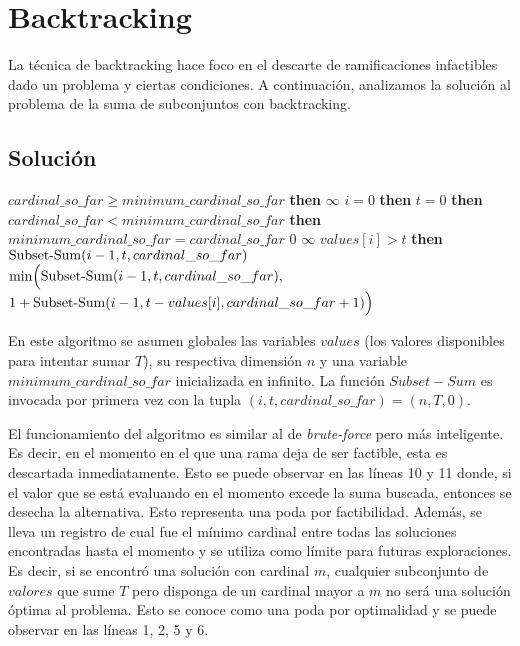 \section{Backtracking}
La técnica de backtracking hace foco en el descarte de ramificaciones infactibles dado un problema y ciertas condiciones. A continuación, analizamos la solución al problema de la suma de subconjuntos con backtracking.

\subsection{Solución}
\begin{center}
	\begin{minipage}{.8\textwidth}
		\begin{codebox}
				\li \If $cardinal\_so\_far \geq minimum\_cardinal\_so\_far$ \textbf{then} \Then
					\li \Return $\infty$
				\End
				\zi
				\li \If $i = 0$ \textbf{then} \Then
					\li \If $t = 0$ \textbf{then}
					\li \Then
						\If $cardinal\_so\_far < minimum\_cardinal\_so\_far$ \textbf{then} \Then
							\li $minimum\_cardinal\_so\_far = cardinal\_so\_far$
						\End
						\zi
						\li \Return $0$
					\li \Else
						\li \Return $\infty$
					\End
				\li \Else \If $values[i] > t$ \textbf{then}
					\li \Return $\func{Subset-Sum}(i - 1, t, cardinal\_so\_far)$
				\li \Else
					\li \Return $\func{min}\Big(\func{Subset-Sum}(i - 1, t, cardinal\_so\_far),$
					\Indentmore \Indentmore \zi $1 + \func{Subset-Sum}(i - 1, t - values[i], cardinal\_so\_far + 1)\Big)$
				\End
			\End
		\end{codebox}

		\label{fig:alg-backtracking}
	\end{minipage}
\end{center}

En este algoritmo se asumen globales las variables $values$ (los valores disponibles para intentar sumar $T$), su respectiva dimensión $n$ y una variable $minimum\_cardinal\_so\_far$ inicializada en infinito. La función $Subset-Sum$ es invocada por primera vez con la tupla $(i, t, cardinal\_so\_far) = (n, T, 0)$.

\vskip 8pt

El funcionamiento del algoritmo es similar al de \textit{brute-force} pero más inteligente. Es decir, en el momento en el que una rama deja de ser factible, esta es descartada inmediatamente. Esto se puede observar en las líneas 10 y 11 donde, si el valor que se está evaluando en el momento excede la suma buscada, entonces se desecha la alternativa. Esto representa una poda por factibilidad. Además, se lleva un registro de cual fue el mínimo cardinal entre todas las soluciones encontradas hasta el momento y se utiliza como límite para futuras exploraciones. Es decir, si se encontró una solución con cardinal $m$, cualquier subconjunto de $valores$ que sume $T$ pero disponga de un cardinal mayor a $m$ no será una solución óptima al problema. Esto se conoce como una poda por optimalidad y se puede observar en las líneas 1, 2, 5 y 6.

